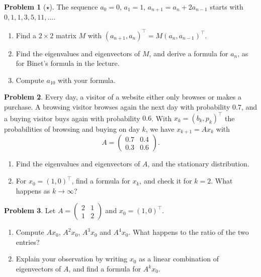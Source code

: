 \documentclass[11pt]{article}
\theoremstyle{definition}
\newtheorem{problem}{Problem}[section]
\begin{document}
\begin{problem}[$\star$]\label{pr:eig-recurrence}
    The sequence $a_0 = 0$, $a_1 = 1$, $a_{n+1} = a_n + 2a_{n-1}$ starts with $0, 1, 1, 3, 5, 11, \ldots$.
    \begin{enumerate}[label=(\alph*)]
        \item Find a $2 \times 2$ matrix $M$ with $(a_{n+1}, a_n)^\top = M (a_n, a_{n-1})^\top$.
        \item Find the eigenvalues and eigenvectors of $M$, and derive a formula for $a_n$, as for Binet's formula in the lecture.
        \item Compute $a_{10}$ with your formula.
    \end{enumerate}
\end{problem}

\begin{problem}\label{pr:eig-markov}
    Every day, a visitor of a website either only browses or makes a purchase. A browsing visitor browses again the next day with probability $0.7$, and a buying visitor buys again with probability $0.6$. With $x_k = (b_k, p_k)^\top$ the probabilities of browsing and buying on day $k$, we have $x_{k+1} = Ax_k$ with
    \[A = \begin{pmatrix} 0.7 & 0.4 \\ 0.3 & 0.6 \end{pmatrix}.\]
    \begin{enumerate}[label=(\alph*)]
        \item Find the eigenvalues and eigenvectors of $A$, and the stationary distribution.
        \item For $x_0 = (1, 0)^\top$, find a formula for $x_k$, and check it for $k = 2$. What happens as $k \to \infty$?
    \end{enumerate}
\end{problem}

\begin{problem}\label{pr:eig-power}
    Let $A = \begin{pmatrix} 2 & 1 \\ 1 & 2 \end{pmatrix}$ and $x_0 = (1, 0)^\top$.
    \begin{enumerate}[label=(\alph*)]
        \item Compute $Ax_0$, $A^2x_0$, $A^3x_0$ and $A^4x_0$. What happens to the ratio of the two entries?
        \item Explain your observation by writing $x_0$ as a linear combination of eigenvectors of $A$, and find a formula for $A^k x_0$.
    \end{enumerate}
\end{problem}
\end{document}
